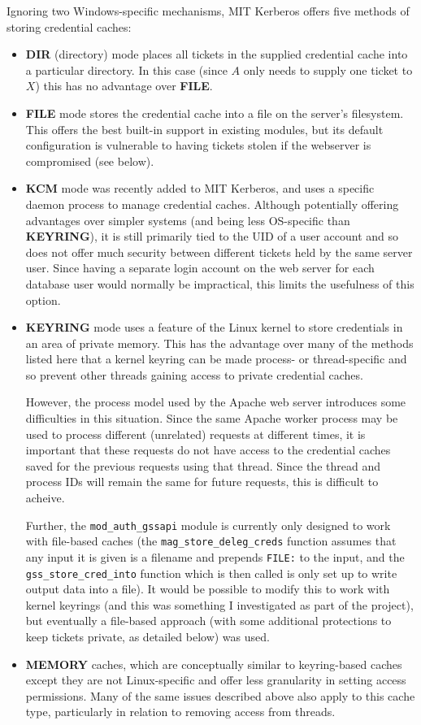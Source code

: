 \documentclass{article}
\begin{document}
Ignoring two Windows-specific mechanisms, MIT Kerberos offers five methods of storing credential caches\cite{MIT-ccache-types}:

\begin{itemize}
\item
  \textbf{DIR} (directory) mode places all tickets in the supplied credential cache into a particular directory. In this case (since $A$ only needs to supply one ticket to $X$) this has no advantage over \textbf{FILE}.
\item
  \textbf{FILE} mode stores the credential cache into a file on the server's filesystem. This offers the best built-in support in existing modules, but its default configuration is vulnerable to having tickets stolen if the webserver is compromised (see below).
\item
  \textbf{KCM} mode was recently added to MIT Kerberos, and uses a specific daemon process to manage credential caches. Although potentially offering advantages over simpler systems (and being less OS-specific than \textbf{KEYRING}), it is still primarily tied to the UID of a user account and so does not offer much security between different tickets held by the same server user. Since having a separate login account on the web server for each database user would normally be impractical, this limits the usefulness of this option.
\item
  \textbf{KEYRING} mode uses a feature of the Linux kernel to store credentials in an area of private memory. This has the advantage over many of the methods listed here that a kernel keyring can be made process- or thread-specific and so prevent other threads gaining access to private credential caches.

  However, the process model used by the Apache web server introduces some difficulties in this situation. Since the same Apache worker process may be used to process different (unrelated) requests at different times, it is important that these requests do not have access to the credential caches saved for the previous requests using that thread. Since the thread and process IDs will remain the same for future requests, this is difficult to acheive.

  Further, the \verb+mod_auth_gssapi+ module is currently only designed to work with file-based caches (the \verb+mag_store_deleg_creds+ function assumes that any input it is given is a filename and prepends \texttt{FILE:} to the input, and the \verb+gss_store_cred_into+ function which is then called is only set up to write output data into a file). It would be possible to modify this to work with kernel keyrings (and this was something I investigated as part of the project), but eventually a file-based approach (with some additional protections to keep tickets private, as detailed below) was used.
\item
  \textbf{MEMORY} caches, which are conceptually similar to keyring-based caches except they are not Linux-specific and offer less granularity in setting access permissions. Many of the same issues described above also apply to this cache type, particularly in relation to removing access from threads.
\end{itemize}
\end{document}
